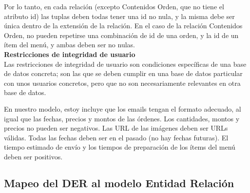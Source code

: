 Por lo tanto, en cada relación (excepto Contenidos Orden, que no tiene el atributo id) las tuplas deben todas tener una id no nula, y la misma debe ser única dentro de la extensión de la relación. En el caso de la relación Contenidos Orden, no pueden repetirse una combinación de id de una orden, y la id de un ítem del menú, y ambas deben ser no nulas. \\

\textbf{Restricciones de integridad de usuario} \\

Las restricciones de integridad de usuario son condiciones específicas de una base de datos concreta; son las que se deben cumplir en una base de datos particular con unos usuarios concretos, pero que no son necesariamente relevantes en otra base de datos.

En nuestro modelo, estoy incluye que los emails tengan el formato adecuado, al igual que las fechas, precios y montos de las órdenes. Los cantidades, montos y precios no pueden ser negativos. Las URL de las imágenes deben ser URLs válidas. Todas las fechas deben ser en el pasado (no hay fechas futuras). El tiempo estimado de envío y los tiempos de preparación de los ítems del menú deben ser positivos.


\subsection{Mapeo del DER al modelo Entidad Relación}

